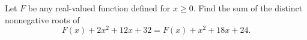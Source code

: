 Let $F$ be any real-valued function defined for $x\ge0$. Find the sum of the distinct nonnegative roots of
\[F(x)+2x^2+12x+32=F(x)+x^2+18x+24.\]
